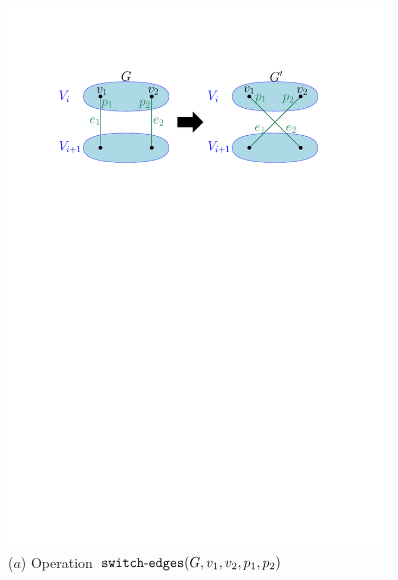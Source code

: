 \documentclass[11pt]{article}
\begin{document}
\begin{figure}[!t]
\begin{center}
  \begin{minipage}[t]{0.49\linewidth}
    \centering
	\includegraphics[width=0.9\textwidth]{images/switch-edges.pdf}\\
    {\footnotesize ($a$) Operation ${\tt switch\mbox{-}edges}(G,v_1,v_2,p_1,p_2)$}
  \end{minipage}
  \begin{minipage}[t]{0.49\linewidth}
    \centering

\end{minipage}
\end{center}
\end{figure}
\end{document}
